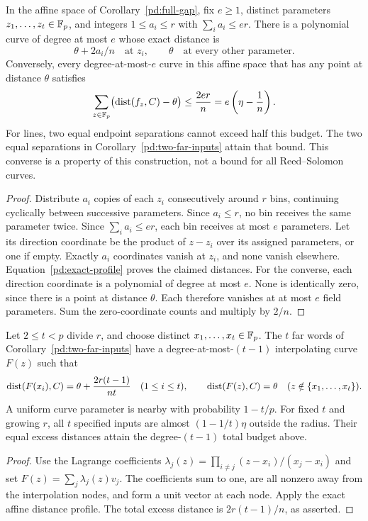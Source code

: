 \begin{corollary}
\label{pd:distance-budget}
In the affine space of Corollary~\ref{pd:full-gap}, fix $e\ge1$,
distinct parameters $z_1,\ldots,z_t\in\mathbb F_p$, and integers
$1\le a_i\le r$ with $\sum_i a_i\le er$.
There is a polynomial curve of degree at most $e$ whose exact distance is
\[
 \theta+2a_i/n\quad\text{at }z_i,\qquad
 \theta\quad\text{at every other parameter}.
\]
Conversely, every degree-at-most-$e$ curve in this affine space that
has any point at distance $\theta$ satisfies
\[
 \sum_{z\in\mathbb F_p}\bigl(\operatorname{dist}(f_z,C)-\theta\bigr)
 \le\frac{2er}{n}=e\left(\eta-\frac1n\right).
\]
For lines, two equal endpoint separations cannot exceed half
this budget. The two equal separations in
Corollary~\ref{pd:two-far-inputs} attain that bound.
This converse is a property of this construction, not a bound for all
Reed--Solomon curves.
\end{corollary}
\begin{proof}
Distribute $a_i$ copies of each $z_i$ consecutively around $r$ bins,
continuing cyclically between successive parameters. Since $a_i\le r$,
no bin receives the same parameter twice. Since $\sum_i a_i\le er$,
each bin receives at most $e$ parameters. Let its direction coordinate
be the product of $z-z_i$ over its assigned parameters, or one if empty.
Exactly $a_i$ coordinates vanish at $z_i$, and none vanish elsewhere.
Equation~\eqref{pd:exact-profile} proves the claimed distances.
For the converse, each direction coordinate is a polynomial of degree
at most $e$. None is identically zero, since there is a point at distance
$\theta$. Each therefore vanishes at at most $e$ field parameters.
Sum the zero-coordinate counts and multiply by $2/n$.
\end{proof}

\begin{corollary}\label{pd:far-interpolation}
Let $2\le t<p$ divide $r$, and choose distinct
$x_1,\ldots,x_t\in\mathbb F_p$. The $t$ far words of
Corollary~\ref{pd:two-far-inputs} have a degree-at-most-$(t-1)$
interpolating curve $F(z)$ such that
\[
 \operatorname{dist}(F(x_i),C)=\theta+\frac{2r(t-1)}{nt}
 \quad(1\le i\le t),\qquad
 \operatorname{dist}(F(z),C)=\theta\quad(z\notin\{x_1,\ldots,x_t\}).
\]
A uniform curve parameter is nearby with probability $1-t/p$.
For fixed $t$ and growing $r$, all $t$ specified inputs are almost
$(1-1/t)\eta$ outside the radius. Their equal excess distances
attain the degree-$(t-1)$ total budget above.
\end{corollary}
\begin{proof}
Use the Lagrange coefficients
$\lambda_j(z)=\prod_{i\ne j}(z-x_i)/(x_j-x_i)$ and set
$F(z)=\sum_j\lambda_j(z)v_j$. The coefficients sum to one,
are all nonzero away from the interpolation nodes, and form a unit
vector at each node. Apply the exact affine distance profile.
The total excess distance is $2r(t-1)/n$, as asserted.
\end{proof}
